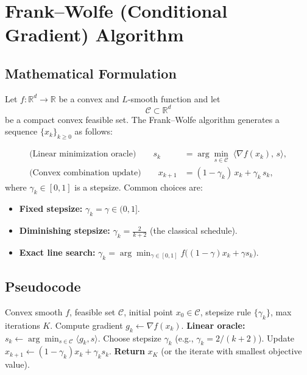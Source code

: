 \documentclass{article}
\begin{document}
\section*{Frank–Wolfe (Conditional Gradient) Algorithm}

\subsection*{Mathematical Formulation}
Let $f:\mathbb{R}^d\rightarrow\mathbb{R}$ be a convex and $L$‑smooth function and let 
\[
\mathcal{C}\subset\mathbb{R}^d
\]
be a compact convex feasible set.  
The Frank–Wolfe algorithm generates a sequence $\{x_k\}_{k\ge 0}$ as follows:

\begin{align}
\text{(Linear minimization oracle)}\qquad 
s_k &= \arg\min_{s\in\mathcal{C}}\;\langle \nabla f(x_k),\,s\rangle , \label{eq:oracle}\\[4pt]
\text{(Convex combination update)}\qquad 
x_{k+1} &= (1-\gamma_k)\,x_k + \gamma_k\,s_k , \label{eq:update}
\end{align}
where $\gamma_k\in[0,1]$ is a stepsize.  Common choices are:
\begin{itemize}[nosep]
\item \textbf{Fixed stepsize:} $\gamma_k=\gamma\in(0,1]$.
\item \textbf{Diminishing stepsize:} $\displaystyle\gamma_k=\frac{2}{k+2}$ (the classical schedule).
\item \textbf{Exact line search:} $\displaystyle\gamma_k = \arg\min_{\gamma\in[0,1]} f\big((1-\gamma)x_k+\gamma s_k\big)$.
\end{itemize}

\subsection*{Pseudocode}
\begin{algorithm}[H]
\caption{Frank–Wolfe}
\begin{algorithmic}[1]
\Require Convex smooth $f$, feasible set $\mathcal{C}$, initial point $x_0\in\mathcal{C}$, stepsize rule $\{\gamma_k\}$, max iterations $K$.
    \State Compute gradient $g_k \gets \nabla f(x_k)$.
    \State \textbf{Linear oracle:} $s_k \gets \arg\min_{s\in\mathcal{C}}\langle g_k, s\rangle$.
    \State Choose stepsize $\gamma_k$ (e.g., $\gamma_k=2/(k+2)$).
    \State Update $x_{k+1} \gets (1-\gamma_k)x_k + \gamma_k s_k$.
\EndFor
\State \textbf{Return} $x_K$ (or the iterate with smallest objective value).
\end{algorithmic}
\end{algorithm}
\end{document}
